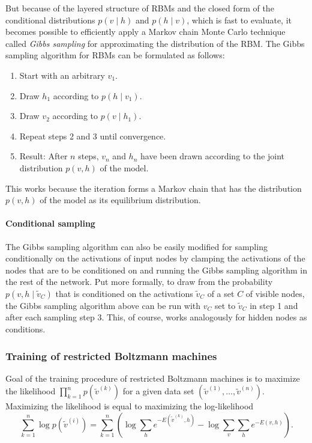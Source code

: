 \documentclass[12pt]{article}
\begin{document}
But because of the layered structure of RBMs and the closed form of the conditional distributions $p(v \mid h)$ and $p(h \mid v)$, which is fast to evaluate, it becomes possible to efficiently apply a Markov chain Monte Carlo technique called \emph{Gibbs sampling} \citep{gibbssamplingorig} for approximating the distribution of the RBM.
The Gibbs sampling  algorithm for RBMs can be formulated as follows:

\begin{enumerate}
\item Start with an arbitrary $v_1$.
\item Draw $h_1$ according to $p(h \mid v_1)$.
\item Draw $v_2$ according to $p(v \mid h_1)$.
\item Repeat steps 2 and 3 until convergence.
\item Result: After $n$ steps, $v_n$ and $h_n$ have been drawn according to the joint distribution $p(v,h)$ of the model.
\end{enumerate}

This works because the iteration forms a Markov chain that has the distribution $p(v,h)$ of the model as its equilibrium distribution.

\paragraph{Conditional sampling}\label{condsamplingrbm}
The Gibbs sampling algorithm can also be easily modified for sampling conditionally on the activations of input nodes by clamping the activations of the nodes that are to be conditioned on and running the Gibbs sampling algorithm in the rest of the network.
Put more formally, to draw from the probability $p(v, h \mid \tilde{v}_C)$ that is conditioned on the activations $\tilde{v}_C$ of a set $C$ of visible nodes, the Gibbs sampling algorithm above can be run with $v_C$ set to $\tilde{v}_C$ in step 1 and after each sampling step 3.
This, of course, works analogously for hidden nodes as conditions.


\subsubsection{Training of restricted Boltzmann machines}\label{rbmtraining}
Goal of the training procedure of restricted Boltzmann machines is to maximize the likelihood $\prod_{k=1}^n p(\widetilde{v}^{(k)})$ for a given data set $(\widetilde{v}^{(1)}, \dots, \widetilde{v}^{(n)})$.
Maximizing the likelihood is equal to maximizing the log-likelihood
\[
\sum_{k=1}^{n}  \log p(\widetilde{v}^{(i)}) = \sum_{k=1}^{n} \left( \log \sum_h e^{-E(\widetilde{v}^{(k)}, h)} - \log \sum_v \sum_h e^{-E(v, h)} \right).
\]
\end{document}
